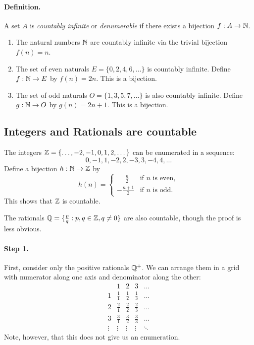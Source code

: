 \paragraph{Definition.} 
A set $A$ is \emph{countably infinite} or {\em denumerable} if there exists a bijection $f:A\to\mathbb{N}$.

\begin{example}
\begin{enumerate}
\item The natural numbers $\mathbb{N}$ are countably infinite via the trivial bijection $f(n)=n$.
\item The set of even naturals $E=\{0,2,4,6,\dots\}$ is countably infinite. Define $f:\mathbb{N}\to E$ by $f(n)=2n$. This is a bijection.
\item The set of odd naturals $O=\{1,3,5,7,\dots\}$ is also countably infinite. Define $g:\mathbb{N}\to O$ by $g(n)=2n+1$. This is a bijection.
\end{enumerate}
\end{example}

\subsection{Integers and Rationals are countable}

The integers $\mathbb{Z}=\{\dots,-2,-1,0,1,2,\dots\}$ can be enumerated in a sequence:
\[
0,-1,1,-2,2,-3,3,-4,4,\dots
\]
Define a bijection $h:\mathbb{N}\to\mathbb{Z}$ by
\[
h(n) = \begin{cases}
\phantom{-}\tfrac{n}{2} & \text{if $n$ is even},\\[6pt]
-\tfrac{n+1}{2} & \text{if $n$ is odd}.
\end{cases}
\]
This shows that $\mathbb{Z}$ is countable.

The rationals $\mathbb{Q}=\{\tfrac{p}{q}: p,q\in\mathbb{Z}, q\neq 0\}$ are also countable, though the proof
is less obvious.

\paragraph{Step 1.} First, consider only the positive rationals $\mathbb{Q}^+$.
We can arrange them in a grid with numerator along one axis and denominator along the other:
\[
\begin{array}{c|cccc}
 & 1 & 2 & 3 & \dots \\
\hline
1 & \tfrac{1}{1} & \tfrac{1}{2} & \tfrac{1}{3} & \dots \\
2 & \tfrac{2}{1} & \tfrac{2}{2} & \tfrac{2}{3} & \dots \\
3 & \tfrac{3}{1} & \tfrac{3}{2} & \tfrac{3}{3} & \dots \\
\vdots & \vdots & \vdots & \vdots & \ddots
\end{array}
\]
Note, however, that this does not give us an enumeration.

